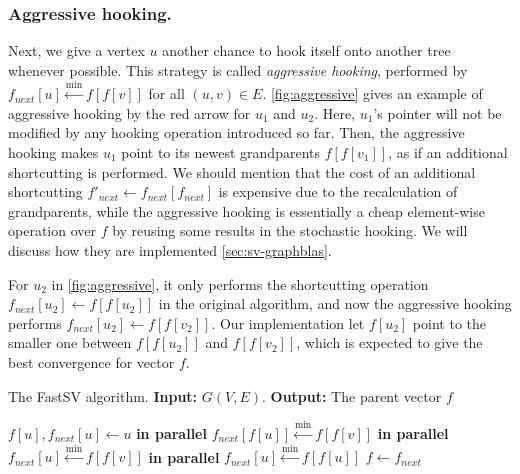 \documentclass{sokendai_thesis} %
\begin{document}
\subsubsection{Aggressive hooking.}
Next, we give a vertex $u$ another chance to hook itself onto another tree whenever possible.
This strategy is called \emph{aggressive hooking}, performed by $f_{\mathit{next}}[u]\xleftarrow{\min} f[f[v]]$ for all $(u,v)\in E$.
\autoref{fig:aggressive} gives an example of aggressive hooking by the red arrow for $u_1$ and $u_2$.
Here, $u_1$'s pointer will not be modified by any hooking operation introduced so far.
Then, the aggressive hooking makes $u_1$ point to its newest grandparents $f[f[v_1]]$, as if an additional shortcutting is performed.
We should mention that the cost of an additional shortcutting $f'_{\mathit{next}}\leftarrow f_{\mathit{next}}[f_{\mathit{next}}]$ is expensive due to the recalculation of grandparents, while the aggressive hooking is essentially a cheap element-wise operation over $f$ by reusing some results in the stochastic hooking.
We will discuss how they are implemented \autoref{sec:sv-graphblas}.

For $u_2$ in \autoref{fig:aggressive}, it only performs the shortcutting operation $f_{\mathit{next}}[u_2]\leftarrow f[f[u_2]]$ in the original algorithm, and now the aggressive hooking performs $f_{\mathit{next}}[u_2]\leftarrow f[f[v_2]]$.
Our implementation let $f[u_2]$ point to the smaller one between $f[f[u_2]]$ and $f[f[v_2]]$, which is expected to give the best convergence for vector $f$.

\begin{algorithm}[t]
\small
\caption{The FastSV algorithm. \textbf{Input:} $G(V,E)$. \textbf{Output:} The parent vector $f$}
\label{algo:algo-two}
\begin{algorithmic}[1]
  \State $f[u], f_{\mathit{next}}[u] \leftarrow u$
\EndFor
\Repeat
  \State{}
   \textbf{in parallel}
    \State $f_\mathit{next}[f[u]] \xleftarrow{\min} f[f[v]]$
  \EndFor
  \State{}
   \textbf{in parallel}
    \State $f_{\mathit{next}}[u] \xleftarrow{\min} f[f[v]]$
  \EndFor
  \State{}
   \textbf{in parallel}
    \State $f_{\mathit{next}}[u] \xleftarrow{\min} f[f[u]]$
  \EndFor
  \State $f\leftarrow f_{\mathit{next}}$
\EndProcedure
\end{algorithmic}
\end{algorithm}
\end{document}
